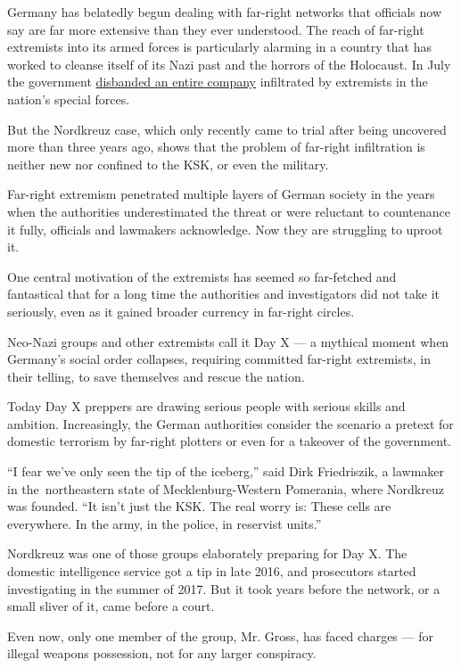 Germany has belatedly begun dealing with far-right networks that
officials now say are far more extensive than they ever understood. The
reach of far-right extremists into its armed forces is particularly
alarming in a country that has worked to cleanse itself of its Nazi past
and the horrors of the Holocaust. In July the government
\href{https://www.nytimes.com/2020/07/01/world/europe/german-special-forces-far-right.html}{disbanded
an entire company} infiltrated by extremists in the nation's special
forces.

But the Nordkreuz case, which only recently came to trial after being
uncovered more than three years ago, shows that the problem of far-right
infiltration is neither new nor confined to the KSK, or even the
military.

Far-right extremism penetrated multiple layers of German society in the
years when the authorities underestimated the threat or were reluctant
to countenance it fully, officials and lawmakers acknowledge. Now they
are struggling to uproot it.

One central motivation of the extremists has seemed so far-fetched and
fantastical that for a long time the authorities and investigators did
not take it seriously, even as it gained broader currency in far-right
circles.

Neo-Nazi groups and other extremists call it Day X --- a mythical moment
when Germany's social order collapses, requiring committed far-right
extremists, in their telling, to save themselves and rescue the nation.

Today Day X preppers are drawing serious people with serious skills and
ambition. Increasingly, the German authorities consider the scenario a
pretext for domestic terrorism by far-right plotters or even for a
takeover of the government.

``I fear we've only seen the tip of the iceberg,'' said Dirk
Friedriszik, a lawmaker in the~northeastern state of Mecklenburg-Western
Pomerania, where Nordkreuz was founded. ``It isn't just the KSK. The
real worry is: These cells are everywhere. In the army, in the police,
in reservist units.''

Nordkreuz was one of those groups elaborately preparing for Day X. The
domestic intelligence service got a tip in late 2016, and prosecutors
started investigating in the summer of 2017. But it took years before
the network, or a small sliver of it, came before a court.

Even now, only one member of the group, Mr. Gross, has faced charges ---
for illegal weapons possession, not for any larger conspiracy.

